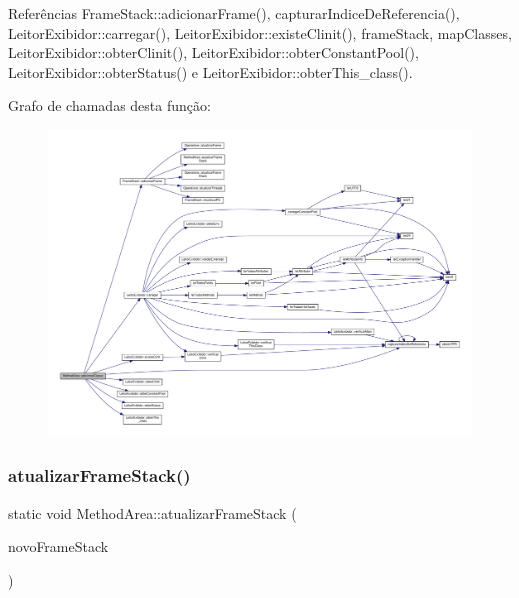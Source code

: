 Referências Frame\+Stack\+::adicionar\+Frame(), capturar\+Indice\+De\+Referencia(), Leitor\+Exibidor\+::carregar(), Leitor\+Exibidor\+::existe\+Clinit(), frame\+Stack, map\+Classes, Leitor\+Exibidor\+::obter\+Clinit(), Leitor\+Exibidor\+::obter\+Constant\+Pool(), Leitor\+Exibidor\+::obter\+Status() e Leitor\+Exibidor\+::obter\+This\+\_\+class().

Grafo de chamadas desta função\+:
\nopagebreak
\begin{figure}[H]
\begin{center}
\leavevmode
\includegraphics[width=350pt]{classMethodArea_af8c5a64c3e17fb33809b1cea9b85a8b1_cgraph}
\end{center}
\end{figure}
\mbox{\label{classMethodArea_ac6423e447a5f46bf969bfb7df7500a2b}} 
\subsubsection{\texorpdfstring{atualizar\+Frame\+Stack()}{atualizarFrameStack()}}
{\footnotesize\ttfamily static void Method\+Area\+::atualizar\+Frame\+Stack (\begin{DoxyParamCaption}\item[{\hyperlink{classFrameStack}{Frame\+Stack} $\ast$}]{novo\+Frame\+Stack }\end{DoxyParamCaption})\hspace{0.3cm}{\ttfamily [static]}}



